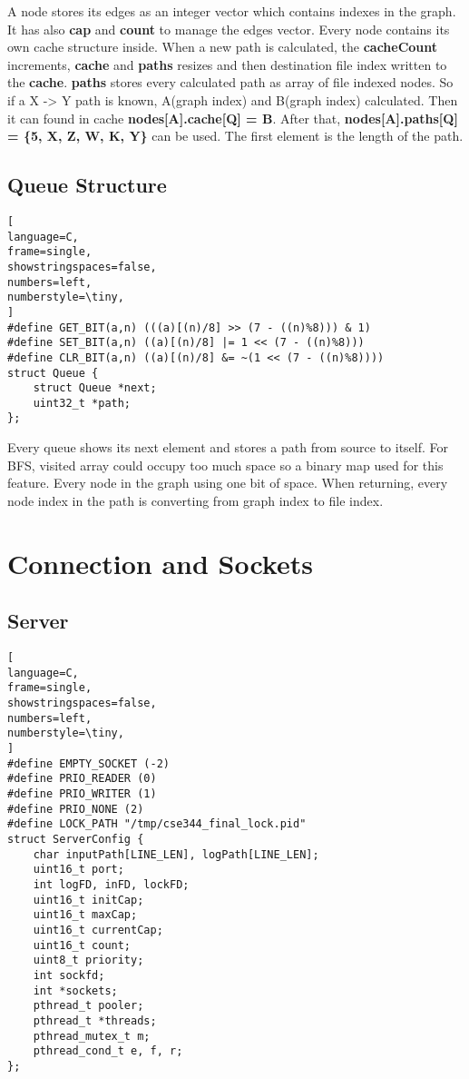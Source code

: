 \documentclass[11pt]{scrartcl} %
\begin{document}
A node stores its edges as an integer vector which contains indexes in the graph. It has also \textbf{cap} and \textbf{count} to manage the edges vector. Every node contains its own cache structure inside. When a new path is calculated, the \textbf{cacheCount} increments, \textbf{cache} and \textbf{paths} resizes and then destination file index written to the \textbf{cache}. \textbf{paths} stores every calculated path as array of file indexed nodes. So if a X -> Y path is known, A(graph index) and B(graph index) calculated. Then it can found in cache \textbf{nodes[A].cache[Q] = B}. After that, \textbf{nodes[A].paths[Q] = \{5, X, Z, W, K, Y\}} can be used. The first element is the length of the path.

\subsection{Queue Structure}

\begin{lstlisting}[
language=C,
frame=single,
showstringspaces=false,
numbers=left,
numberstyle=\tiny,
]
#define GET_BIT(a,n) (((a)[(n)/8] >> (7 - ((n)%8))) & 1)
#define SET_BIT(a,n) ((a)[(n)/8] |= 1 << (7 - ((n)%8)))
#define CLR_BIT(a,n) ((a)[(n)/8] &= ~(1 << (7 - ((n)%8))))
struct Queue {
    struct Queue *next;
    uint32_t *path;
};
\end{lstlisting}

Every queue shows its next element and stores a path from source to itself. For BFS, visited array could occupy too much space so a binary map used for this feature. Every node in the graph using one bit of space. When returning, every node index in the path is converting from graph index to file index.

\section{Connection and Sockets}

\subsection{Server}

\begin{lstlisting}[
language=C,
frame=single,
showstringspaces=false,
numbers=left,
numberstyle=\tiny,
]
#define EMPTY_SOCKET (-2)
#define PRIO_READER (0)
#define PRIO_WRITER (1)
#define PRIO_NONE (2)
#define LOCK_PATH "/tmp/cse344_final_lock.pid"
struct ServerConfig {
    char inputPath[LINE_LEN], logPath[LINE_LEN];
    uint16_t port;
    int logFD, inFD, lockFD;
    uint16_t initCap;
    uint16_t maxCap;
    uint16_t currentCap;
    uint16_t count;
    uint8_t priority;
    int sockfd;
    int *sockets;
    pthread_t pooler;
    pthread_t *threads;
    pthread_mutex_t m;
    pthread_cond_t e, f, r;
};
\end{lstlisting}
\end{document}
